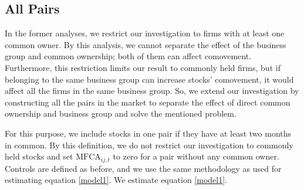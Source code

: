 				
				
				\FloatBarrier
				
				\subsection{All Pairs}
				
					In the former analyses, we restrict our investigation to firms with at least one common owner. By this analysis, we cannot separate the effect of the business group and common ownership; both of them can affect comovement. Furthermore, this restriction limits our result to commonly held firms, but if belonging to the same business group can increase stocks' comovement, it would affect all the firms in the same business group. 
					So, we extend our investigation by constructing all the pairs in the market to separate the effect of direct common ownership and business group and solve the mentioned problem. 
					
					For this purpose, we include stocks in one pair if they have at least two months in common. By this definition, we do not restrict our investigation to commonly held stocks and set $\text{MFCA}_{ij,t}$ to zero for a pair without any common owner. Controls are defined as before, and we use the same methodology as used for estimating equation \ref{model1}. We estimate equation \ref{model1}. 
					
